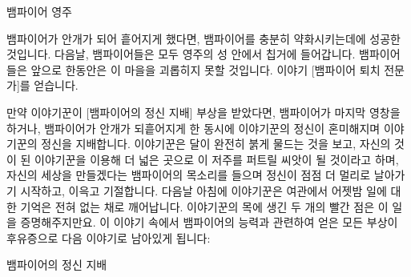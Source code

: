 \documentclass{report}
\begin{document}
\begin{lite}{뱀파이어 영주}
		\subject{흡혈 박쥐}
		
		
		
		\subject{거대 늑대}
		
		
		
	\end{lite}
	
	뱀파이어가 안개가 되어 흩어지게 했다면, 뱀파이어를 충분히 약화시키는데에 성공한 것입니다. 다음날, 뱀파이어들은 모두 영주의 성 안에서 칩거에 들어갑니다. 뱀파이어들은 앞으로 한동안은 이 마을을 괴롭히지 못할 것입니다. 이야기 [뱀파이어 퇴치 전문가]를 얻습니다.
	
	만약 이야기꾼이 [뱀파이어의 정신 지배] 부상을 받았다면, 뱀파이어가 마지막 영창을 하거나, 뱀파이어가 안개가 되흩어지게 한 동시에 이야기꾼의 정신이 혼미해지며 이야기꾼의 정신을 지배합니다. 이야기꾼은 달이 완전히 붉게 물드는 것을 보고, 자신의 것이 된 이야기꾼을 이용해 더 넓은 곳으로 이 저주를 퍼트릴 씨앗이 될 것이라고 하며, 자신의 세상을 만들겠다는 뱀파이어의 목소리를 들으며 정신이 점점 더 멀리로 날아가기 시작하고, 이윽고 기절합니다. 다음날 아침에 이야기꾼은 여관에서 어젯밤 일에 대한 기억은 전혀 없는 채로 깨어납니다. 이야기꾼의 목에 생긴 두 개의 빨간 점은 이 일을 증명해주지만요. 이 이야기 속에서 뱀파이어의 능력과 관련하여 얻은 모든 부상이 후유증으로 다음 이야기로 남아있게 됩니다:
	
	\begin{lite}{뱀파이어의 정신 지배}
	\end{lite}
	
	
\end{document}
